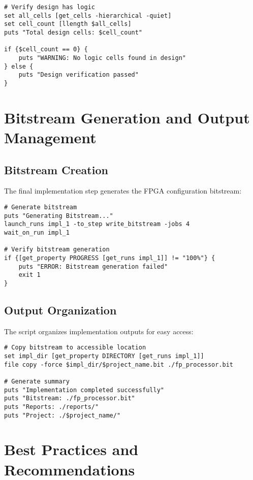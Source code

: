 \begin{lstlisting}[caption=Design Verification]
# Verify design has logic
set all_cells [get_cells -hierarchical -quiet]
set cell_count [llength $all_cells]
puts "Total design cells: $cell_count"

if {$cell_count == 0} {
    puts "WARNING: No logic cells found in design"
} else {
    puts "Design verification passed"
}
\end{lstlisting}

\section{Bitstream Generation and Output Management}
\label{sec:bitstream_generation}

\subsection{Bitstream Creation}

The final implementation step generates the FPGA configuration bitstream:

\begin{lstlisting}[caption=Bitstream Generation]
# Generate bitstream
puts "Generating Bitstream..."
launch_runs impl_1 -to_step write_bitstream -jobs 4
wait_on_run impl_1

# Verify bitstream generation
if {[get_property PROGRESS [get_runs impl_1]] != "100%"} {
    puts "ERROR: Bitstream generation failed"
    exit 1
}
\end{lstlisting}

\subsection{Output Organization}

The script organizes implementation outputs for easy access:

\begin{lstlisting}[caption=Output Management]
# Copy bitstream to accessible location
set impl_dir [get_property DIRECTORY [get_runs impl_1]]
file copy -force $impl_dir/$project_name.bit ./fp_processor.bit

# Generate summary
puts "Implementation completed successfully"
puts "Bitstream: ./fp_processor.bit"
puts "Reports: ./reports/"
puts "Project: ./$project_name/"
\end{lstlisting}

\section{Best Practices and Recommendations}
\label{sec:best_practices}

